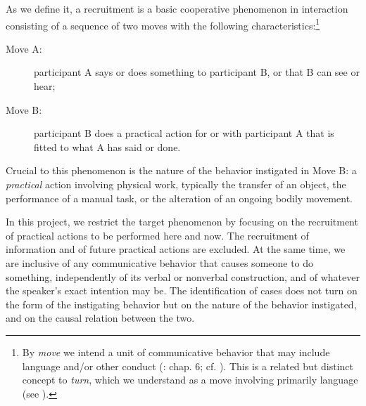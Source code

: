 \documentclass[output=paper,modfonts,nonflat]{langsci/langscibook}
\begin{document}
As we define it, a recruitment is a basic cooperative phenomenon in interaction consisting of a sequence of two moves with the following characteristics:\footnote{ {By} {\textit{move}} {we intend}{ }{a unit of communicative behavior that may include language and/or other conduct} {(\citealt{Enfield2013}: chap. 6; cf. \citealt{Goffman1981}). This is a related but distinct concept to} {\textit{turn}}{, which we understand as a move involving primarily language} {(see \citealt[3--7]{Schegloff2007}}).}

\begin{description}
\item[Move A:] participant A says or does something to participant B, or that B can see or hear;
\item[Move B:] participant B does a practical action for or with participant A that is fitted to what A has said or done.
\end{description}

Crucial to this phenomenon is the nature of the behavior instigated in Move B: a \textit{practical} action involving physical work, typically the transfer of an object, the performance of a manual task, or the alteration of an ongoing bodily movement.

In this project, we restrict the target phenomenon by focusing on the recruitment of practical actions to be performed here and now. The recruitment of information and of future practical actions are excluded. At the same time, we are inclusive of any communicative behavior that causes someone to do something, independently of its verbal or nonverbal construction, and of whatever the speaker’s exact intention may be. The identification of cases does not turn on the form of the instigating behavior but on the nature of the behavior instigated, and on the causal relation between the two.
\end{document}
